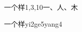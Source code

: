 \begin{entry}{一个样}{1,3,10}{⼀、⼈、⽊}
  \begin{phonetics}{一个样}{yi2ge5yang4}
  \end{phonetics}
\end{entry}
